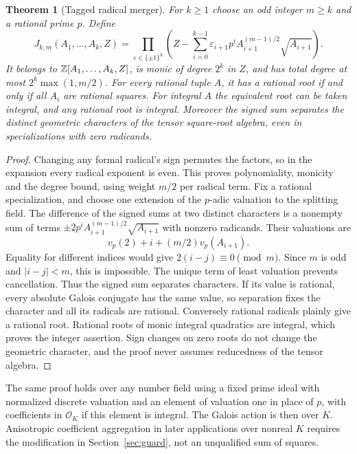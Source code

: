 \documentclass[11pt]{article}
\newtheorem{theorem}{Theorem}[section]
\newcommand{\OK}{\mathcal O_K}\newcommand{\vp}{v_p}\newcommand{\Sp}{\operatorname{Spec}}
\begin{document}
\begin{theorem}[Tagged radical merger]\label{thm:square}
For $k\ge1$ choose an odd integer $m\ge k$ and a rational prime $p$.
Define
\begin{equation}\label{eq:J}
 J_{k,m}(A_1,\ldots,A_k,Z)=
 \prod_{\varepsilon\in\{\pm1\}^k}
 \left(Z-\sum_{i=0}^{k-1}\varepsilon_{i+1}p^i
 A_{i+1}^{(m-1)/2}\sqrt{A_{i+1}}\right).
\end{equation}
It belongs to $\mathbb Z[A_1,\ldots,A_k,Z]$, is monic of degree $2^k$ in $Z$,
and has total degree at most $2^k\max(1,m/2)$. For every rational tuple
$A$, it has a rational root if and only if all $A_i$ are rational squares.
For integral $A$ the equivalent root can be taken integral, and any
rational root is integral. Moreover the signed sum separates the
\emph{distinct} geometric characters of the tensor square-root algebra,
even in specializations with zero radicands.
\end{theorem}
\begin{proof}
Changing any formal radical's sign permutes the factors, so in the
expansion every radical exponent is even. This proves polynomiality,
monicity and the degree bound, using weight $m/2$ per radical term.
Fix a rational specialization, and choose one extension of the
$p$-adic valuation to the splitting field. The difference of the signed
sums at two distinct characters is a nonempty sum of terms
$\pm2 p^i A_{i+1}^{(m-1)/2}\sqrt{A_{i+1}}$ with nonzero radicands.
Their valuations are
\[
 v_p(2)+i+(m/2)v_p(A_{i+1}).
\]
Equality for different indices would give $2(i-j)\equiv0\pmod m$.
Since $m$ is odd and $|i-j|<m$, this is impossible. The unique term of
least valuation prevents cancellation. Thus the signed sum separates
characters. If its value is rational, every absolute Galois conjugate
has the same value, so separation fixes the character and all its
radicals are rational. Conversely rational radicals plainly give a
rational root. Rational roots of monic integral quadratics are integral,
which proves the integer assertion. Sign changes on zero roots do not
change the geometric character, and the proof never assumes reducedness
of the tensor algebra.
\end{proof}

The same proof holds over any number field using a fixed prime ideal
with normalized discrete valuation and an element of valuation one
in place of $p$, with coefficients in $\OK$ if this element is integral.
The Galois action is then over $K$. Anisotropic coefficient aggregation
in later applications over nonreal $K$ requires the modification in
Section~\ref{sec:guard}, not an unqualified sum of squares.
\end{document}
